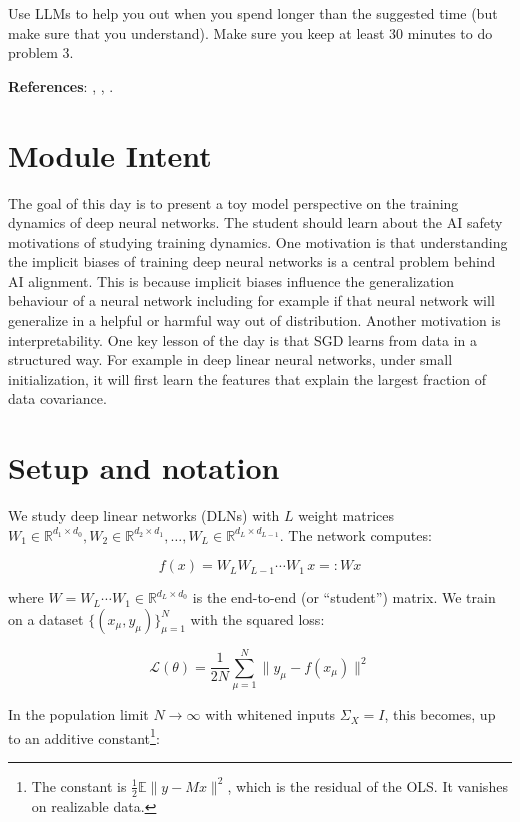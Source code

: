 \documentclass[11pt]{article}
\begin{document}
Use LLMs to help you out when you spend longer than the suggested time (but make sure that you understand). Make sure you keep at least 30 minutes to do problem 3.

\textbf{References}: \cite{saxe2014}, \cite{achour2024}, \cite{tu2024}.

\section{Module Intent}

The goal of this day is to present a toy model perspective on the training 
dynamics of deep neural networks. The student should learn about the AI safety 
motivations of studying training dynamics. One motivation is that understanding 
the implicit biases of training deep neural networks is a central problem behind 
AI alignment. This is because implicit biases influence the generalization 
behaviour of a neural network including for example if that neural network will 
generalize in a helpful or harmful way out of distribution. Another motivation 
is interpretability. One key lesson of the day is that SGD learns from data in a 
structured way. For example in deep linear neural networks, under small 
initialization, it will first learn the features that explain the largest 
fraction of data covariance.

\section{Setup and notation}

We study deep linear networks (DLNs) with \(L\) weight matrices
\(W_1 \in \mathbb{R}^{d_1 \times d_0}, W_2 \in \mathbb{R}^{d_2 \times d_1}, \ldots, W_L \in \mathbb{R}^{d_L \times d_{L-1}}\).
The network computes:

\[f(x) = W_L W_{L-1} \cdots W_1 \, x =: W x\]

where \(W = W_L \cdots W_1 \in \mathbb{R}^{d_L \times d_0}\) is the
end-to-end (or ``student'') matrix. We train on a dataset
\(\{(x_\mu, y_\mu)\}_{\mu=1}^N\) with the squared loss:

\[\mathcal{L}(\theta) = \frac{1}{2N} \sum_{\mu=1}^{N} \|y_\mu - f(x_\mu)\|^2\]

In the population limit \(N \to \infty\) with whitened inputs \(\Sigma_X = I\), this becomes, up to an additive constant\footnote{The constant is \(\frac{1}{2}\mathbb{E}\|y - Mx\|^2\), which is the residual of the OLS. It vanishes on realizable data.}:
\end{document}
